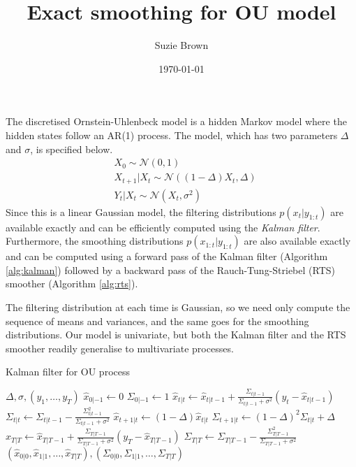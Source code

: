 \documentclass[fleqn]{article}
\title{Exact smoothing for OU model}
\author{Suzie Brown}
\date{\today}
\newcommand{\N}{\mathcal{N}}
\begin{document}
\maketitle
\thispagestyle{fancy}

The discretised Ornstein-Uhlenbeck model is a hidden Markov model where the hidden states follow an AR(1) process. The model, which has two parameters $\Delta$ and $\sigma$, is specified below.
\begin{align*}
& X_0 \sim \N(0,1) \\
& X_{t+1} | X_t \sim \N((1-\Delta)X_t, \Delta) \\
& Y_t | X_t \sim \N(X_t, \sigma^2)
\end{align*}
Since this is a linear Gaussian model, the filtering distributions $p(x_t | y_{1:t})$ are available exactly and can be efficiently computed using the \emph{Kalman filter}. Furthermore, the smoothing distributions $p(x_{1:t} | y_{1:t})$ are also available exactly and can be computed using a forward pass of the Kalman filter (Algorithm \ref{alg:kalman}) followed by a backward pass of the Rauch-Tung-Striebel (RTS) smoother (Algorithm \ref{alg:rts}).

The filtering distribution at each time is Gaussian, so we need only compute the sequence of means and variances, and the same goes for the smoothing distributions. Our model is univariate, but both the Kalman filter and the RTS smoother readily generalise to multivariate processes.

\begin{algorithm}
\caption{Kalman filter for OU process}
\label{alg:kalman}
\begin{algorithmic}[1]
\Require $\Delta, \sigma, (y_1, \dots, y_T)$
\State $\hat{x}_{0|-1} \gets 0$
\State $\Sigma_{0|-1} \gets 1$
	\State $\hat{x}_{t|t} \gets \hat{x}_{t|t-1} + \frac{\Sigma_{t|t-1}}{\Sigma_{t|t-1} + \sigma^2}(y_t - \hat{x}_{t|t-1})$
	\State $\Sigma_{t|t} \gets \Sigma_{t|t-1} - \frac{\Sigma_{t|t-1}^2}{\Sigma_{t|t-1} + \sigma^2}$
	\State $\hat{x}_{t+1|t} \gets (1-\Delta)\hat{x}_{t|t}$
	\State $\Sigma_{t+1|t} \gets (1-\Delta)^2 \Sigma_{t|t} + \Delta$
\EndFor
\State $\hat{x}_{T|T} \gets \hat{x}_{T|T-1} + \frac{\Sigma_{T|T-1}}{\Sigma_{T|T-1} + \sigma^2}(y_T - \hat{x}_{T|T-1})$
\State $\Sigma_{T|T} \gets \Sigma_{T|T-1} - \frac{\Sigma_{T|T-1}^2}{\Sigma_{T|T-1} + \sigma^2}$
\State\Return $(\hat{x}_{0|0}, \hat{x}_{1|1}, \dots, \hat{x}_{T|T}), (\Sigma_{0|0}, \Sigma_{1|1}, \dots, \Sigma_{T|T})$
\end{algorithmic}
\end{algorithm}
\end{document}
